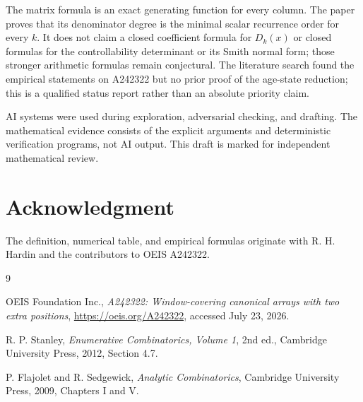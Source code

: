 \documentclass[11pt]{article}
\theoremstyle{remark}
\begin{document}
The matrix formula is an exact generating function for every column.  The
paper proves that its denominator degree is the minimal scalar recurrence
order for every $k$.  It does not claim a closed coefficient formula for
$D_k(x)$ or closed formulas for the controllability determinant or its Smith
normal form; those stronger arithmetic formulas remain conjectural.  The
literature search found the empirical statements on A242322 but no prior proof
of the age-state reduction; this is a qualified status report rather than an
absolute priority claim.

AI systems were used during exploration, adversarial checking, and drafting.
The mathematical evidence consists of the explicit arguments and deterministic
verification programs, not AI output.  This draft is marked for independent
mathematical review.

\section*{Acknowledgment}
The definition, numerical table, and empirical formulas originate with R. H.
Hardin and the contributors to OEIS A242322.

\begin{thebibliography}{9}

OEIS Foundation Inc.,
\emph{A242322: Window-covering canonical arrays with two extra positions},
\url{https://oeis.org/A242322}, accessed July 23, 2026.

R. P. Stanley,
\emph{Enumerative Combinatorics, Volume 1}, 2nd ed.,
Cambridge University Press, 2012, Section 4.7.

P. Flajolet and R. Sedgewick,
\emph{Analytic Combinatorics},
Cambridge University Press, 2009, Chapters I and V.

\end{thebibliography}
\end{document}

